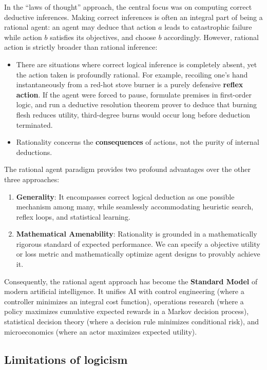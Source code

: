 \begin{enumerate}
  In the ``laws of thought'' approach, the central focus was on computing correct deductive inferences. Making correct inferences is often an integral part of being a rational agent: an agent may deduce that action $a$ leads to catastrophic failure while action $b$ satisfies its objectives, and choose $b$ accordingly. However, rational action is strictly broader than rational inference:
  \begin{itemize}[noitemsep]
    \item There are situations where correct logical inference is completely absent, yet the action taken is profoundly rational. For example, recoiling one's hand instantaneously from a red-hot stove burner is a purely defensive \textbf{reflex action}. If the agent were forced to pause, formulate premises in first-order logic, and run a deductive resolution theorem prover to deduce that burning flesh reduces utility, third-degree burns would occur long before deduction terminated.
    \item Rationality concerns the \textbf{consequences} of actions, not the purity of internal deductions.
  \end{itemize}
  
  The rational agent paradigm provides two profound advantages over the other three approaches:
  \begin{enumerate}
    \item \textbf{Generality}: It encompasses correct logical deduction as one possible mechanism among many, while seamlessly accommodating heuristic search, reflex loops, and statistical learning.
    \item \textbf{Mathematical Amenability}: Rationality is grounded in a mathematically rigorous standard of expected performance. We can specify a objective utility or loss metric and mathematically optimize agent designs to provably achieve it.
  \end{enumerate}
  Consequently, the rational agent approach has become the \textbf{Standard Model} of modern artificial intelligence. It unifies AI with control engineering (where a controller minimizes an integral cost function), operations research (where a policy maximizes cumulative expected rewards in a Markov decision process), statistical decision theory (where a decision rule minimizes conditional risk), and microeconomics (where an actor maximizes expected utility).
\end{enumerate}

\subsection{Limitations of logicism}
\label{sec:logicist_limitations}

